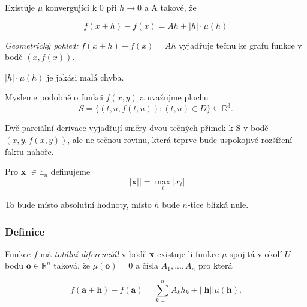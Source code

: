 \documentclass[../main.tex]{subfiles}
\begin{document}
\noindent
\hspace{1.2mm}
Existuje $\mu$ konvergující k 0 při $h \rightarrow 0$ a A takové, že 

\[f(x+h) - f(x) = Ah + |h| \cdot \mu(h)\]

\noindent
\hspace{1.2mm}
\textit{Geometrický pohled:}
$f(x+h) - f(x) = Ah$ vyjadřuje tečnu ke grafu funkce v bodě $(x,f(x)).$

\noindent
\hspace{1.2mm}
$|h|\cdot \mu(h)$ je jakási malá chyba.

\noindent
\hspace{1.2mm}
Mysleme podobně o funkci $f(x,y)$ a uvažujme plochu 
\[S = \{(t,u,f(t,u)) : (t,u) \in D\} \subseteq \mathbb{R}^3.\]

\noindent
\hspace{1.2mm}
Dvě parciální derivace vyjadřují směry dvou tečných přímek k S v bodě $(x,y,f(x,y))$, ale \underline{ne tečnou rovinu}, 
která teprve bude uspokojivé rozšíření faktu nahoře.

\noindent
\hspace{1.2mm}
Pro \textbf{x} $\in \mathbb{E}_n$ definujeme
\[||\textbf{x}||  = \max_i|x_i|\]

\noindent
\hspace{1.2mm}
To bude místo absolutní hodnoty, místo $h$ bude $n$-tice blízká nule.

\subsubsection{Definice}
\hspace{1.2mm}
Funkce $f$ má \textit{totální diferenciál} v bodě \textbf{x} existuje-li funkce $\mu$ spojitá v okolí $U$ bodu $\textbf{o} \in \mathbb{R}^n$ taková, že $\mu(\textbf{o}) = 0$
a čísla $A_1,...,A_n$ pro která

\[f(\textbf{a}+\textbf{h}) - f(\textbf{a}) = \sum^n_{k=1}A_kh_k+||\textbf{h}||\mu(\textbf{h}).\]

\end{document}
